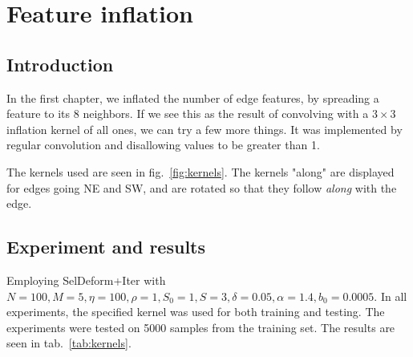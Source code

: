 \documentclass{report}
\begin{document}
\chapter{Feature inflation}

\section{Introduction}
In the first chapter, we inflated the number of edge features, by spreading a feature to its 8 neighbors. If we see this as the result of convolving with a $3\times 3$ inflation kernel of all ones, we can try a few more things. It was implemented by regular convolution and disallowing values to be greater than 1. 

The kernels used are seen in fig.~\ref{fig:kernels}. The kernels "along" are displayed for edges going NE and SW, and are rotated so that they follow {\em along} with the edge.

\section{Experiment and results}
Employing SelDeform+Iter with $N=100, M=5, \eta=100, \rho=1, S_0=1, S=3, \delta=0.05, \alpha=1.4, b_0 = 0.0005$. In all experiments, the specified kernel was used for both training and testing. The experiments were tested on 5000 samples from the training set. The results are seen in tab.~\ref{tab:kernels}.
\end{document}
